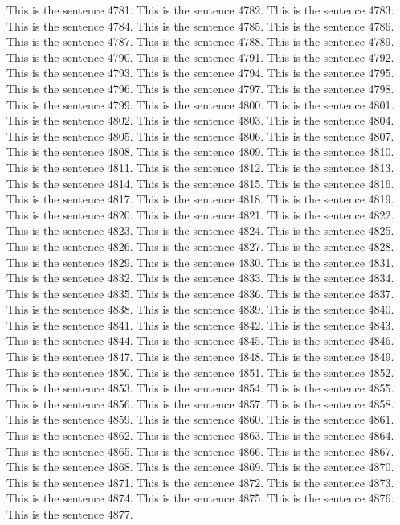 \documentclass{article}
\begin{document}
This is the sentence 4781.
This is the sentence 4782.
This is the sentence 4783.
This is the sentence 4784.
This is the sentence 4785.
This is the sentence 4786.
This is the sentence 4787.
This is the sentence 4788.
This is the sentence 4789.
This is the sentence 4790.
This is the sentence 4791.
This is the sentence 4792.
This is the sentence 4793.
This is the sentence 4794.
This is the sentence 4795.
This is the sentence 4796.
This is the sentence 4797.
This is the sentence 4798.
This is the sentence 4799.
This is the sentence 4800.
This is the sentence 4801.
This is the sentence 4802.
This is the sentence 4803.
This is the sentence 4804.
This is the sentence 4805.
This is the sentence 4806.
This is the sentence 4807.
This is the sentence 4808.
This is the sentence 4809.
This is the sentence 4810.
This is the sentence 4811.
This is the sentence 4812.
This is the sentence 4813.
This is the sentence 4814.
This is the sentence 4815.
This is the sentence 4816.
This is the sentence 4817.
This is the sentence 4818.
This is the sentence 4819.
This is the sentence 4820.
This is the sentence 4821.
This is the sentence 4822.
This is the sentence 4823.
This is the sentence 4824.
This is the sentence 4825.
This is the sentence 4826.
This is the sentence 4827.
This is the sentence 4828.
This is the sentence 4829.
This is the sentence 4830.
This is the sentence 4831.
This is the sentence 4832.
This is the sentence 4833.
This is the sentence 4834.
This is the sentence 4835.
This is the sentence 4836.
This is the sentence 4837.
This is the sentence 4838.
This is the sentence 4839.
This is the sentence 4840.
This is the sentence 4841.
This is the sentence 4842.
This is the sentence 4843.
This is the sentence 4844.
This is the sentence 4845.
This is the sentence 4846.
This is the sentence 4847.
This is the sentence 4848.
This is the sentence 4849.
This is the sentence 4850.
This is the sentence 4851.
This is the sentence 4852.
This is the sentence 4853.
This is the sentence 4854.
This is the sentence 4855.
This is the sentence 4856.
This is the sentence 4857.
This is the sentence 4858.
This is the sentence 4859.
This is the sentence 4860.
This is the sentence 4861.
This is the sentence 4862.
This is the sentence 4863.
This is the sentence 4864.
This is the sentence 4865.
This is the sentence 4866.
This is the sentence 4867.
This is the sentence 4868.
This is the sentence 4869.
This is the sentence 4870.
This is the sentence 4871.
This is the sentence 4872.
This is the sentence 4873.
This is the sentence 4874.
This is the sentence 4875.
This is the sentence 4876.
This is the sentence 4877.
\end{document}
